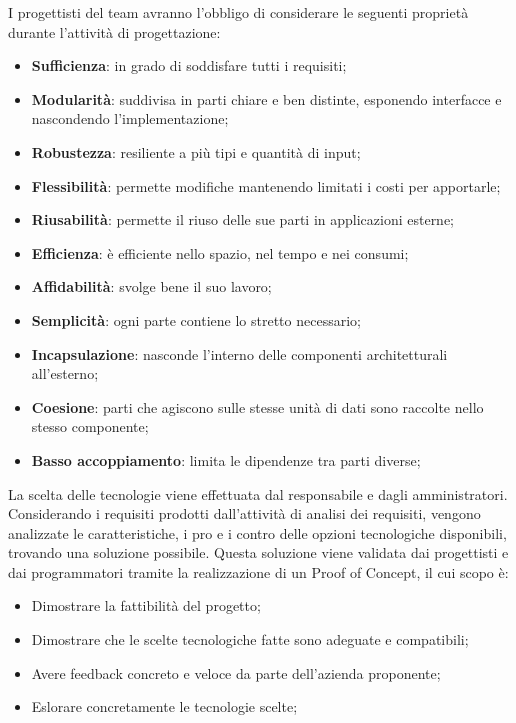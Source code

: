 \documentclass[10pt, a4paper]{article}
\begin{document}
I progettisti del team avranno l'obbligo di considerare le seguenti proprietà durante l'attività di progettazione:
\begin{itemize}
    \item \textbf{Sufficienza}: in grado di soddisfare tutti i requisiti;
    \item \textbf{Modularità}: suddivisa in parti chiare e ben distinte, esponendo interfacce e nascondendo l'implementazione;
    \item \textbf{Robustezza}: resiliente a più tipi e quantità di input;
    \item \textbf{Flessibilità}: permette modifiche mantenendo limitati i costi per apportarle;
    \item \textbf{Riusabilità}: permette il riuso delle sue parti in applicazioni esterne;
    \item \textbf{Efficienza}: è efficiente nello spazio, nel tempo e nei consumi;
    \item \textbf{Affidabilità}: svolge bene il suo lavoro;
    \item \textbf{Semplicità}: ogni parte contiene lo stretto necessario;
    \item \textbf{Incapsulazione}: nasconde l'interno delle componenti architetturali all'esterno;
    \item \textbf{Coesione}: parti che agiscono sulle stesse unità di dati sono raccolte nello stesso componente;
    \item \textbf{Basso accoppiamento}: limita le dipendenze tra parti diverse;
\end{itemize}

La scelta delle tecnologie viene effettuata dal responsabile e dagli amministratori.
Considerando i requisiti prodotti dall'attività di analisi dei requisiti, vengono analizzate le caratteristiche, i pro e i contro delle opzioni tecnologiche disponibili, trovando una soluzione possibile.
Questa soluzione viene validata dai progettisti e dai programmatori tramite la realizzazione di un Proof of Concept, il cui scopo è:
\begin{itemize}
    \item Dimostrare la fattibilità del progetto;
    \item Dimostrare che le scelte tecnologiche fatte sono adeguate e compatibili;
    \item Avere feedback concreto e veloce da parte dell'azienda proponente;
    \item Eslorare concretamente le tecnologie scelte;
\end{itemize}
\end{document}
